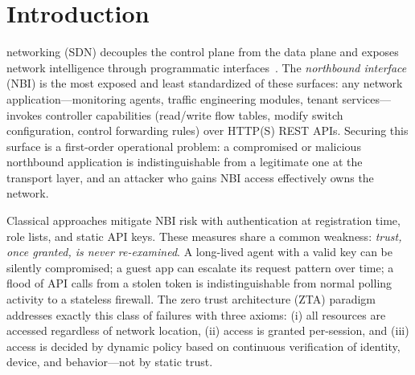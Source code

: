 \documentclass[journal]{IEEEtran}
\begin{document}
\section{Introduction}
 networking (SDN) decouples the control plane from the data plane and exposes network intelligence through programmatic interfaces~\cite{kreutz}. The \emph{northbound interface} (NBI) is the most exposed and least standardized of these surfaces: any network application---monitoring agents, traffic engineering modules, tenant services---invokes controller capabilities (read/write flow tables, modify switch configuration, control forwarding rules) over HTTP(S) REST APIs. Securing this surface is a first-order operational problem: a compromised or malicious northbound application is indistinguishable from a legitimate one at the transport layer, and an attacker who gains NBI access effectively owns the network.

Classical approaches mitigate NBI risk with authentication at registration time, role lists, and static API keys. These measures share a common weakness: \emph{trust, once granted, is never re-examined}. A long-lived agent with a valid key can be silently compromised; a guest app can escalate its request pattern over time; a flood of API calls from a stolen token is indistinguishable from normal polling activity to a stateless firewall. The zero trust architecture (ZTA) paradigm~\cite{nist} addresses exactly this class of failures with three axioms: (i) all resources are accessed regardless of network location, (ii) access is granted per-session, and (iii) access is decided by dynamic policy based on continuous verification of identity, device, and behavior---not by static trust.
\end{document}
